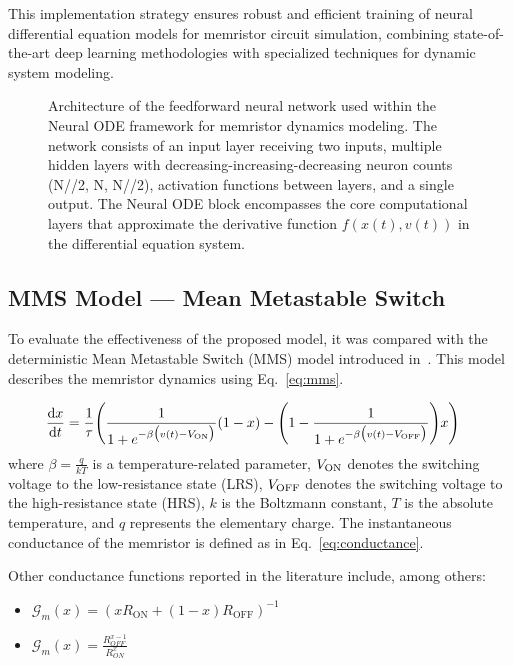 \documentclass[11pt, oneside]{article}
\newcommand{\G}{\mathcal{G}}
\newcommand{\von}{V_{\rm ON}}
\newcommand{\voff}{V_{\rm OFF}}
\newcommand{\ua}{v}
\newcommand{\xw}{x}
\newcommand{\dert}[1]{\frac{{\rm d} {#1}}{{\rm d} t} }
\begin{document}
This implementation strategy ensures robust and efficient training of neural differential equation models for memristor circuit simulation, combining state-of-the-art deep learning methodologies with specialized techniques for dynamic system modeling.


\begin{figure}[H]
    \centering
    \resizebox{\linewidth}{!}{%
        
    }
    \caption{Architecture of the feedforward neural network used within the Neural ODE framework for memristor dynamics modeling. The network consists of an input layer receiving two inputs, multiple hidden layers with decreasing-increasing-decreasing neuron counts (N//2, N, N//2), activation functions between layers, and a single output. The Neural ODE block encompasses the core computational layers that approximate the derivative function $f(\xw(t), \ua(t))$ in the differential equation system.}

    \label{fig:nn-arch}
\end{figure}


\subsection{MMS Model — Mean Metastable Switch}

To evaluate the effectiveness of the proposed model, it was compared with the deterministic Mean Metastable Switch (MMS) model introduced in~\cite{Molter2016, Ostrovskii2021}. This model describes the memristor dynamics using Eq.~\eqref{eq:mms}.


\begin{align}
    \label{eq:mms}
    \dert{x} & =  \frac{1}{\tau} \Bigg( \frac{1}{1+e^{-\beta \big(\ua(t)-\von\big)}} (1-x)  -\Bigg(1- \frac{1}{1+e^{-\beta \big(\ua(t)-\voff\big)}} \Bigg) x \Bigg)
\end{align}
where $\beta= \frac{q}{kT}$ is a temperature-related parameter, $\von$ denotes the switching voltage to the low-resistance state (LRS), $\voff$ denotes the switching voltage to the high-resistance state (HRS), $k$ is the Boltzmann constant, $T$ is the absolute temperature, and $q$ represents the elementary charge. The instantaneous conductance of the memristor is defined as in Eq.~\eqref{eq:conductance}.

Other conductance functions reported in the literature include, among others:
\begin{itemize}
    \item $\G_m(x) = \left( x R_{\mathrm{ON}} + (1 - x) R_{\mathrm{OFF}} \right)^{-1}$
    \item $\G_m(x) = \frac{R_{OFF}^{x-1}}{R_{ON}^x}$
\end{itemize}
\end{document}
